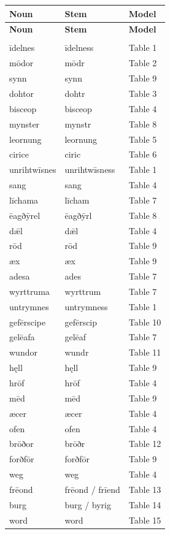 \par\begingroup
\fontsize{10.5}{13.2}\selectfont
\setlength{\LTleft}{0pt}\setlength{\LTright}{\fill}
\begin{longtable}{@{}>{\raggedright\arraybackslash}p{48mm}>{\raggedright\arraybackslash}p{48mm}>{\raggedright\arraybackslash}p{22.37mm}@{}}
\toprule
\textbf{Noun} & \textbf{Stem} & \textbf{Model} \\
\midrule
\endfirsthead
\toprule
\textbf{Noun} & \textbf{Stem} & \textbf{Model} \\
\midrule
\endhead
\midrule
\multicolumn{3}{r}{\footnotesize Continued on the following page.}\\
\endfoot
\bottomrule
\endlastfoot
īdelnes & īdelness & Table 1 \\
mōdor & mōdr & Table 2 \\
synn & synn & Table 9 \\
dohtor & dohtr & Table 3 \\
bisceop & bisceop & Table 4 \\
mynster & mynstr & Table 8 \\
leornung & leornung & Table 5 \\
cirice & ciric & Table 6 \\
unrihtwīsnes & unrihtwīsness & Table 1 \\
sang & sang & Table 4 \\
līchama & līcham & Table 7 \\
ēagðȳrel & ēagðȳrl & Table 8 \\
dǣl & dǣl & Table 4 \\
rōd & rōd & Table 9 \\
æx & æx & Table 9 \\
adesa & ades & Table 7 \\
wyrttruma & wyrttrum & Table 7 \\
untrymnes & untrymness & Table 1 \\
gefērscipe & gefērscip & Table 10 \\
gelēafa & gelēaf & Table 7 \\
wundor & wundr & Table 11 \\
hęll & hęll & Table 9 \\
hrōf & hrōf & Table 4 \\
mēd & mēd & Table 9 \\
æcer & æcer & Table 4 \\
ofen & ofen & Table 4 \\
brōðor & brōðr & Table 12 \\
forðfōr & forðfōr & Table 9 \\
weg & weg & Table 4 \\
frēond & frēond /\allowbreak{} frīend & Table 13 \\
burg & burg /\allowbreak{} byrig & Table 14 \\
word & word & Table 15 \\
\end{longtable}
